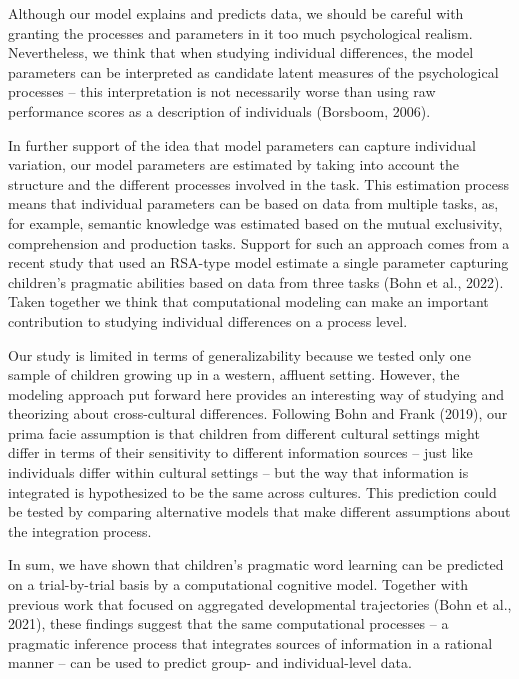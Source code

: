 \documentclass[
  man,mask,floatsintext]{apa6}
\begin{document}
Although our model explains and predicts data, we should be careful with granting the processes and parameters in it too much psychological realism. Nevertheless, we think that when studying individual differences, the model parameters can be interpreted as candidate latent measures of the psychological processes -- this interpretation is not necessarily worse than using raw performance scores as a description of individuals (Borsboom, 2006).

In further support of the idea that model parameters can capture individual variation, our model parameters are estimated by taking into account the structure and the different processes involved in the task. This estimation process means that individual parameters can be based on data from multiple tasks, as, for example, semantic knowledge was estimated based on the mutual exclusivity, comprehension and production tasks. Support for such an approach comes from a recent study that used an RSA-type model estimate a single parameter capturing children's pragmatic abilities based on data from three tasks (Bohn et al., 2022). Taken together we think that computational modeling can make an important contribution to studying individual differences on a process level.

Our study is limited in terms of generalizability because we tested only one sample of children growing up in a western, affluent setting. However, the modeling approach put forward here provides an interesting way of studying and theorizing about cross-cultural differences. Following Bohn and Frank (2019), our prima facie assumption is that children from different cultural settings might differ in terms of their sensitivity to different information sources -- just like individuals differ within cultural settings -- but the way that information is integrated is hypothesized to be the same across cultures. This prediction could be tested by comparing alternative models that make different assumptions about the integration process.

In sum, we have shown that children's pragmatic word learning can be predicted on a trial-by-trial basis by a computational cognitive model. Together with previous work that focused on aggregated developmental trajectories (Bohn et al., 2021), these findings suggest that the same computational processes -- a pragmatic inference process that integrates sources of information in a rational manner -- can be used to predict group- and individual-level data.

\newpage
\end{document}
